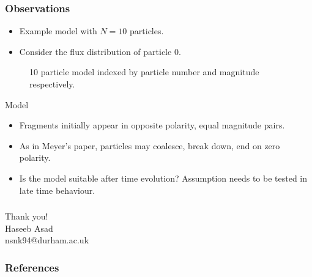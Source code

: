 \documentclass{beamer}
\begin{document}
\begin{frame}
    \frametitle{Observations}
    \small
    \begin{itemize}
        \item Example model with $N=10$ particles.
        \item Consider the flux distribution of particle 0. 
    \end{itemize}
    \begin{figure}
      \centering
      \caption{10 particle model indexed by particle number and magnitude respectively.}
      \label{fig:analysis}
    \end{figure}
\end{frame}
\begin{frame}{Model}
    \small
    \begin{itemize}
    \item Fragments initially appear in opposite polarity, equal magnitude pairs.
    \item As in Meyer's paper, particles may coalesce, break down, end on zero polarity.
    \item Is the model suitable after time evolution? Assumption needs to be tested in late time behaviour.
    \end{itemize}
    \centering
    
    
\end{frame}


\begin{frame}
    \frametitle{}
    \centering
    \Large\color{oxfordblue}
    Thank you!\\
    Haseeb Asad \\
    nsnk94@durham.ac.uk

\end{frame}

\begin{frame}
\frametitle{References}
\small
\end{frame}

\end{document}
